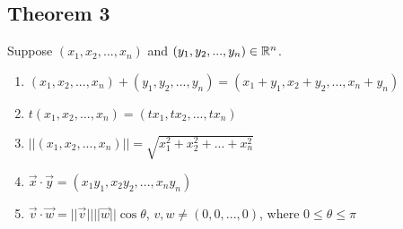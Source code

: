 \documentclass[12pt]{article} %
\begin{document}
\subsection*{Theorem 3}
\begin{grayBoxed}
    Suppose $(x_1, x_2, ..., x_n)$ and $(y_1, y_2, ..., y_n) \in \mathbb{R}^n$.
    \begin{enumerate}
        \item $(x_1, x_2, ..., x_n) + (y_1, y_2, ..., y_n) = (x_1 + y_1, x_2 + y_2, ..., x_n + y_n)$
        \item $t (x_1, x_2, ..., x_n) = (tx_1, tx_2, ..., tx_n)$
        \item $||(x_1, x_2, ..., x_n)|| = \sqrt{x_{1}^2 + x_{2}^2 + ... + x_{n}^2}$
        \item $\vec{x} \cdot \vec{y} = (x_1  y_1, x_2  y_2, ..., x_n y_n)$
        \item $\vec{v} \cdot \vec{w} = ||\vec{v}|| ||\vec{w}|| \cos{\theta}$, $v, w \not = (0, 0, ..., 0)$, where $0 \leq \theta \leq \pi$
    \end{enumerate}
\end{grayBoxed}
\end{document}
